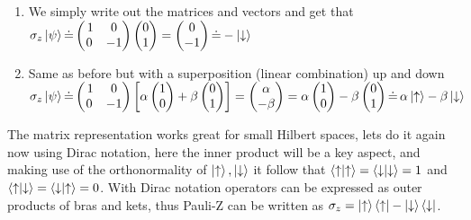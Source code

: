 \begin{enumerate}[label = \textbf{\alph*)}]
\item We simply write out the matrices and vectors and get that \\$\sigma_z\ket{\psi} \dot{=} \begin{pmatrix}
\,1 & 0 \\
0 & -1 \\
\end{pmatrix}\begin{pmatrix}
0 \\ 1
\end{pmatrix} = \begin{pmatrix}
0 \\ -1
\end{pmatrix} \dot{=} -\ket{\downarrow}$ 

\item Same as before but with a superposition (linear combination) up and down 
\\$\sigma_z\ket{\psi} \dot{=} \begin{pmatrix}
\,1 & 0 \\
0 & -1 \\
\end{pmatrix}\left[\alpha\begin{pmatrix}
1 \\ 0
\end{pmatrix} + \beta\begin{pmatrix}
0 \\ 1
\end{pmatrix} \right]= \begin{pmatrix}
\alpha \\ -\beta
\end{pmatrix}  = \alpha\begin{pmatrix}
1 \\ 0
\end{pmatrix} -\beta\begin{pmatrix}
0 \\ 1
\end{pmatrix} \dot{=}\, \alpha\ket{\uparrow} - \beta\ket{\downarrow}$ \end{enumerate}
The matrix representation works great for small Hilbert spaces, lets do it again now using Dirac notation, here the inner product will be a key aspect, and making use of the orthonormality of $\ket{\uparrow},\ket{\downarrow}$ it follow that $\bra{\uparrow}\ket{\uparrow} = \bra{\downarrow}\ket{\downarrow} = 1$ and $\bra{\uparrow}\ket{\downarrow} = \bra{\downarrow}\ket{\uparrow} = 0$.
With Dirac notation operators can be expressed as outer products of bras and kets, thus Pauli-Z can be written as $\sigma_z = \ket{\uparrow}\bra{\uparrow} - \ket{\downarrow}\bra{\downarrow}$.

